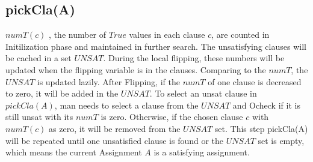 \documentclass[12pt,a4paper,twoside]{scrartcl}
\numberwithin{equation}{section}
\begin{document}
\subsection{pickCla(A)}
$numT(c)$ , the number of $True$ values in each clause $c$, are counted in Initilization phase and maintained in further search. The unsatisfying clauses will be cached in a set $UNSAT$. During the local flipping, these numbers will be updated when the flipping variable is in the clauses.  Comparing to the $numT$, the $UNSAT$ is updated lazily. After Flipping, if the $numT$ of one clause is decreased to zero, it will be added in the $UNSAT$.  To select an unsat clause in $pickCla(A)$, man needs to select a clause from the $UNSAT$ and Ocheck if it is still unsat with its $numT$ is zero. Otherwise, if the chosen clause $c$ with $numT(c)$ as zero, it will be removed from the $UNSAT$ set. This step pickCla(A) will be repeated until one unsatisfied clause is found or the $UNSAT$ set is empty, which means the current Assignment $A$ is a satisfying assignment.\\ 
\\
\end{document}
